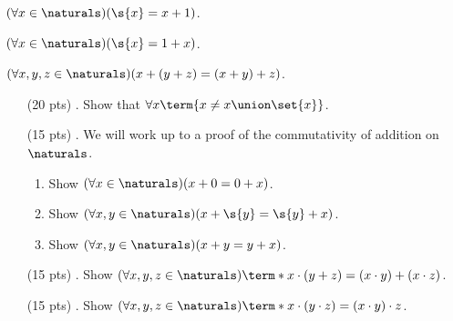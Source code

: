 {  $(\forall x \in \naturals)(\s{x} = x + 1)$.

  $(\forall x \in \naturals)(\s{x} = 1 + x)$.

  $(\forall x, y, z \in \naturals)(x + (y + z) = (x + y) + z)$.
}

\begin{enumerate}

  \item[(20 pts) \quad 1.]
    Show that $\forall x \term{x \neq x \union \set{x}}$.

  \item[(15 pts) \quad 2.]
    We will work up to a proof of the commutativity of addition on $\naturals$.
    \begin{enumerate}
      \item
        Show $(\forall x \in \naturals)(x + 0 = 0 + x)$.
      \item
        Show $(\forall x, y \in \naturals)(x + \s{y} = \s{y} + x)$.
      \item
        Show $(\forall x, y \in \naturals)(x + y = y + x)$.
    \end{enumerate}

  \item[(15 pts) \quad 3.]
    Show $(\forall x, y, z \in \naturals)\term*{x \cdot (y + z) = (x \cdot y) + (x \cdot z)}$.

  \item[(15 pts) \quad 4.]
    Show $(\forall x, y, z \in \naturals)\term*{x \cdot (y \cdot z) = (x \cdot y) \cdot z}$.



\end{enumerate}
